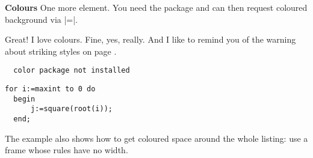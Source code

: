 \begin{paracol}{2}
\textbf{Colours}
One more element. You need the  package and can then
request coloured background via
|=|.
\begin{advise}
\item Great! I love colours.
     \advisespace
     Fine, yes, really. And I like to remind you of the warning about
     striking styles on page \pageref{wStrikingStyles}.
\end{advise}
\ifcolor
\begin{lstxsample}[backgroundcolor]
\end{lstxsample}
\else
\begin{verbatim}
  color package not installed\end{verbatim}
\fi
\begin{lstsample}{}{}
  \begin{lstlisting}[frame=single,
                     framerule=0pt]
  for i:=maxint to 0 do
  begin
      j:=square(root(i));
  end;
  \end{lstlisting}
\end{lstsample}
The example also shows how to get coloured space around the whole listing:
use a frame whose rules have no width.


\end{paracol}